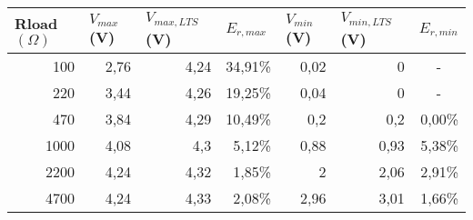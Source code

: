 \documentclass{article}
\begin{document}
\begin{table}[ht!]
\centering
\begin{tabular}{|r|r|r|r|r|r|r|}
\hline
\multicolumn{1}{|l|}{Rload $(\Omega)$} & \multicolumn{1}{l|}{$V_{max}$ (V)} & \multicolumn{1}{l|}{$V_{max, LTS}$ (V)} & \multicolumn{1}{l|}{$E_{r,max}$} & \multicolumn{1}{l|}{$V_{min}$ (V)} & \multicolumn{1}{l|}{$V_{min, LTS}$ (V)} & \multicolumn{1}{l|}{$E_{r,min}$} \\ \hline
100                                    & 2,76                               & 4,24                                    & 34,91\%                                               & 0,02                                                    & 0                                       & \multicolumn{1}{c|}{-}           \\ \hline
220                                    & 3,44                               & 4,26                                    & 19,25\%                                               & 0,04                                                    & 0                                       & \multicolumn{1}{c|}{-}           \\ \hline
470                                    & 3,84                               & 4,29                                    & 10,49\%                                               & 0,2                                                     & 0,2                                     & 0,00\%                           \\ \hline
1000                                   & 4,08                               & 4,3                                     & 5,12\%                                                & 0,88                                                    & 0,93                                    & 5,38\%                           \\ \hline
2200                                   & 4,24                               & 4,32                                    & 1,85\%                                                & 2                                                       & 2,06                                    & 2,91\%                           \\ \hline
4700                                   & 4,24                               & 4,33                                    & 2,08\%                                                & 2,96                                                    & 3,01                                    & 1,66\%                           \\ \hline

\end{tabular}
\end{table}
\end{document}
